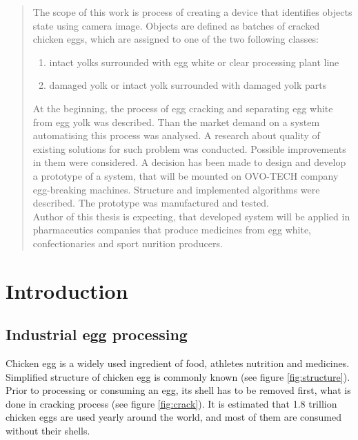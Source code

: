 \documentclass[12pt,twoside,a4paper]{article}
\begin{document}
\begin{abstract}
The scope of this work is process of creating a device that identifies objects state using camera image. Objects are defined as batches of cracked chicken eggs, which are assigned to one of the two following classes:
\begin{enumerate}
\item intact yolks surrounded with egg white or clear processing plant line
\item damaged yolk or intact yolk surrounded with damaged yolk parts
\end{enumerate}
At the beginning, the process of egg cracking and separating egg white from egg yolk was described. Than the market demand on a system automatising this process was analysed.
A research about quality of existing solutions for such problem was conducted. Possible improvements in them were considered.
A decision has been made to design and develop a prototype of a system, that will be mounted on OVO-TECH company egg-breaking machines.
Structure and implemented algorithms were described. The prototype was manufactured and tested.\\
Author of this thesis is expecting, that developed system will be applied in pharmaceutics companies that produce medicines from egg white, confectionaries and sport nurition producers.

\end{abstract}
\newpage 
\tableofcontents


\section{Introduction}
\subsection{Industrial egg processing}
Chicken egg is a widely used ingredient of food, athletes nutrition and medicines. Simplified structure of chicken egg is commonly known (see figure \ref{fig:structure}). Prior to processing or consuming an egg, its shell has to be removed first, what is done in cracking process (see figure \ref{fig:crack}). It is estimated that 1.8 trillion chicken eggs are used yearly around the world\cite{trillion}, and most of them are consumed without their shells. 
\end{document}
